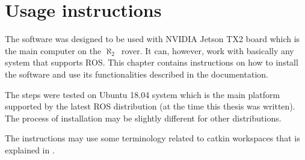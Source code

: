\documentclass[english,inz,shortabstract]{iithesis}
\newcommand{\rovername}{$\aleph_2$\ }
\begin{document}
\chapter{Usage instructions}
The software was designed to be used with \textsf{NVIDIA Jetson TX2} board which is the main computer on the \rovername rover. It can, however, work with basically any system that supports ROS. This chapter contains instructions on how to install the software and use its functionalities described in the documentation. 

The steps were tested on \textsf{Ubuntu 18.04} system which is the main platform supported by the latest ROS distribution (at the time this thesis was written). The process of installation may be slightly different for other distributions.

The instructions may use some terminology related to catkin workspaces that is explained in \cite{usage:workspace}.
\end{document}
